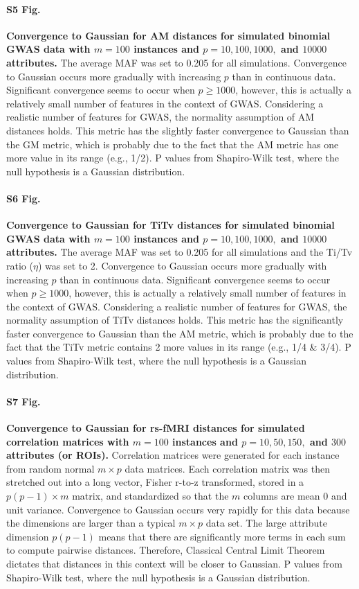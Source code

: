 \documentclass[10pt,letterpaper]{article}
\begin{document}
\paragraph*{S5 Fig.}
\hypertarget{S5_Fig}{
{\bf Convergence to Gaussian for AM distances for simulated binomial GWAS data with $m=100$ instances and $p=10, 100, 1000,$ and $10000$ attributes.} The average MAF was set to 0.205 for all simulations. Convergence to Gaussian occurs more gradually with increasing $p$ than in continuous data. Significant convergence seems to occur when $p \geq 1000$, however, this is actually a relatively small number of features in the context of GWAS. Considering a realistic number of features for GWAS, the normality assumption of AM distances holds. This metric has the slightly faster convergence to Gaussian than the GM metric, which is probably due to the fact that the AM metric has one more value in its range (e.g., 1/2). P values from Shapiro-Wilk test, where the null hypothesis is a Gaussian distribution.}

\paragraph*{S6 Fig.}
\hypertarget{S6_Fig}{
{\bf Convergence to Gaussian for TiTv distances for simulated binomial GWAS data with $m=100$ instances and $p=10, 100, 1000,$ and $10000$ attributes.} The average MAF was set to 0.205 for all simulations and the Ti/Tv ratio ($\eta$) was set to 2. Convergence to Gaussian occurs more gradually with increasing $p$ than in continuous data. Significant convergence seems to occur when $p \geq 1000$, however, this is actually a relatively small number of features in the context of GWAS. Considering a realistic number of features for GWAS, the normality assumption of TiTv distances holds. This metric has the significantly faster convergence to Gaussian than the AM metric, which is probably due to the fact that the TiTv metric contains 2 more values in its range (e.g., 1/4 \& 3/4). P values from Shapiro-Wilk test, where the null hypothesis is a Gaussian distribution.}

\paragraph*{S7 Fig.}
\hypertarget{S7_Fig}{
{\bf Convergence to Gaussian for rs-fMRI distances for simulated correlation matrices with $m=100$ instances and $p=10, 50, 150,$ and $300$ attributes (or ROIs).} Correlation matrices were generated for each instance from random normal $m \times p$ data matrices. Each correlation matrix was then stretched out into a long vector, Fisher r-to-z transformed, stored in a $p(p-1) \times m$ matrix, and standardized so that the $m$ columns are mean 0 and unit variance. Convergence to Gaussian occurs very rapidly for this data because the dimensions are larger than a typical $m \times p$ data set. The large attribute dimension $p(p-1)$ means that there are significantly more terms in each sum to compute pairwise distances. Therefore, Classical Central Limit Theorem dictates that distances in this context will be closer to Gaussian. P values from Shapiro-Wilk test, where the null hypothesis is a Gaussian distribution.}
\end{document}
